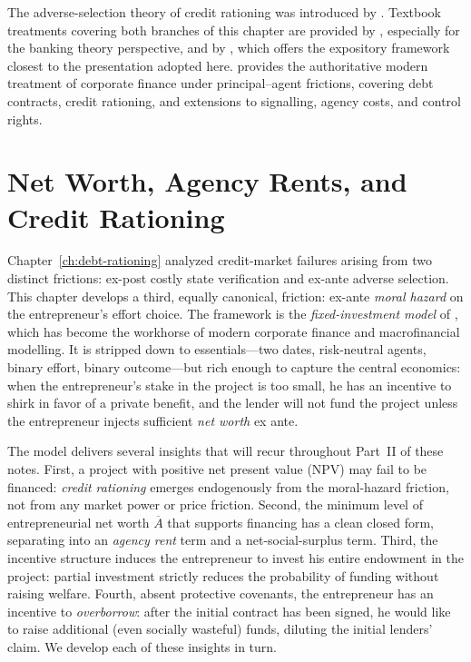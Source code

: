 \documentclass[11pt,a4paper,oneside]{book}
\theoremstyle{plain}
\theoremstyle{definition}
\theoremstyle{remark}
\numberwithin{equation}{chapter}
\begin{document}
The adverse-selection theory of credit rationing was introduced by \citet{StiglitzWeiss1981}.
Textbook treatments covering both branches of this chapter are provided by \citet{FreixasRochet1997}, especially for the banking theory perspective, and by \citet{EichbergerHarper1997}, which offers the expository framework closest to the presentation adopted here.
\citet{Tirole2006} provides the authoritative modern treatment of corporate finance under principal--agent frictions, covering debt contracts, credit rationing, and extensions to signalling, agency costs, and control rights.

\chapter{Net Worth, Agency Rents, and Credit Rationing}
\label{ch:net-worth}

Chapter~\ref{ch:debt-rationing} analyzed credit-market failures arising from two distinct frictions: ex-post costly state verification and ex-ante adverse selection.
This chapter develops a third, equally canonical, friction: ex-ante \emph{moral hazard} on the entrepreneur's effort choice.
The framework is the \emph{fixed-investment model} of \citet{HolmstromTirole1997}, which has become the workhorse of modern corporate finance and macrofinancial modelling.
It is stripped down to essentials---two dates, risk-neutral agents, binary effort, binary outcome---but rich enough to capture the central economics: when the entrepreneur's stake in the project is too small, he has an incentive to shirk in favor of a private benefit, and the lender will not fund the project unless the entrepreneur injects sufficient \emph{net worth} ex ante.

The model delivers several insights that will recur throughout Part~II of these notes.
First, a project with positive net present value (NPV) may fail to be financed: \emph{credit rationing} emerges endogenously from the moral-hazard friction, not from any market power or price friction.
Second, the minimum level of entrepreneurial net worth $\overline{A}$ that supports financing has a clean closed form, separating into an \emph{agency rent} term and a net-social-surplus term.
Third, the incentive structure induces the entrepreneur to invest his entire endowment in the project: partial investment strictly reduces the probability of funding without raising welfare.
Fourth, absent protective covenants, the entrepreneur has an incentive to \emph{overborrow}: after the initial contract has been signed, he would like to raise additional (even socially wasteful) funds, diluting the initial lenders' claim.
We develop each of these insights in turn.
\end{document}
